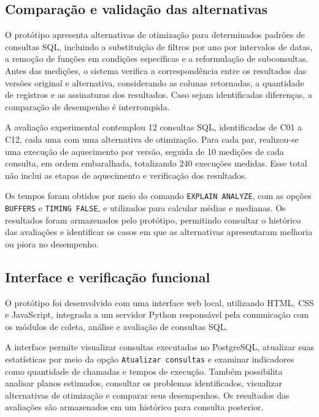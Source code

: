 \documentclass{UNESC}
\newcommand{\codigo}[1]{\texttt{#1}}
\begin{document}
\subsection{Comparação e validação das alternativas}

O protótipo apresenta alternativas de otimização para determinados padrões de consultas SQL, incluindo a substituição de filtros por ano por intervalos de datas, a remoção de funções em condições específicas e a reformulação de subconsultas. Antes das medições, o sistema verifica a correspondência entre os resultados das versões original e alternativa, considerando as colunas retornadas, a quantidade de registros e as assinaturas dos resultados. Caso sejam identificadas diferenças, a comparação de desempenho é interrompida.

A avaliação experimental contemplou 12 consultas SQL, identificadas de C01 a C12, cada uma com uma alternativa de otimização. Para cada par, realizou-se uma execução de aquecimento por versão, seguida de 10 medições de cada consulta, em ordem embaralhada, totalizando 240 execuções medidas. Esse total não inclui as etapas de aquecimento e verificação dos resultados.

Os tempos foram obtidos por meio do comando \codigo{EXPLAIN ANALYZE}, com as opções \codigo{BUFFERS} e \codigo{TIMING FALSE}, e utilizados para calcular médias e medianas. Os resultados foram armazenados pelo protótipo, permitindo consultar o histórico das avaliações e identificar os casos em que as alternativas apresentaram melhoria ou piora no desempenho.



\subsection{Interface e verificação funcional}

O protótipo foi desenvolvido com uma interface web local, utilizando HTML, CSS e JavaScript, integrada a um servidor Python responsável pela comunicação com os módulos de coleta, análise e avaliação de consultas SQL.

A interface permite visualizar consultas executadas no PostgreSQL, atualizar suas estatísticas por meio da opção \codigo{Atualizar consultas} e examinar indicadores como quantidade de chamadas e tempos de execução. Também possibilita analisar planos estimados, consultar os problemas identificados, visualizar alternativas de otimização e comparar seus desempenhos. Os resultados das avaliações são armazenados em um histórico para consulta posterior.
\end{document}
